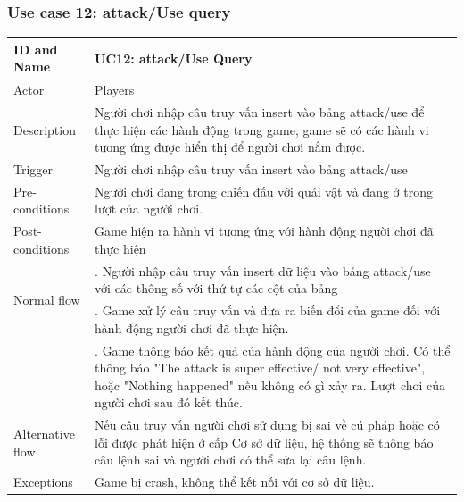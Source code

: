 \subsubsection{Use case 12: attack/Use query}
\begin{center}
	\begin{tabular}{|l|p{12cm}|}
		\hline
		ID and Name & UC12: attack/Use Query \\
		\hline
		Actor  & Players \\
		\hline
		Description  & Người chơi nhập câu truy vấn insert vào bảng attack/use để thực hiện các hành động trong game, game sẽ có các hành vi tương ứng được hiển thị để người chơi nắm được.\\
		\hline
		Trigger  & Người chơi nhập câu truy vấn insert vào bảng attack/use\\
		\hline
		Pre-conditions & Người chơi đang trong chiến đấu với quái vật và đang ở trong lượt của người chơi.\\
		\hline
		Post-conditions & Game hiện ra hành vi tương ứng với hành động người chơi đã thực hiện\\
		\hline
		\multirow{2}{*}{Normal flow}      &\qquad 1. Người nhập câu truy vấn insert dữ liệu vào bảng attack/use với các thông số với thứ tự các cột của bảng\\
		&\qquad 2. Game xử lý câu truy vấn và đưa ra biến đổi của game đối với hành động người chơi đã thực hiện.\\
		&\qquad 3. Game thông báo kết quả của hành động của người chơi. Có thể thông báo "The attack is super effective/ not very effective", hoặc "Nothing happened" nếu không có gì xảy ra. Lượt chơi của người chơi sau đó kết thúc.\\
		\hline
		Alternative flow  & Nếu câu truy vấn người chơi sử dụng bị sai về cú pháp hoặc có lỗi được phát hiện ở cấp Cơ sở dữ liệu, hệ thống sẽ thông báo câu lệnh sai và người chơi có thể sửa lại câu lệnh.\\
		\hline
		Exceptions  & Game bị crash, không thể kết nối với cơ sở dữ liệu.\\
		\hline
	\end{tabular}
\end{center}
